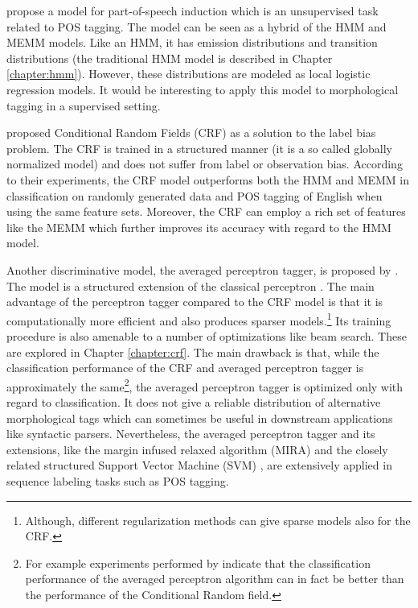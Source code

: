 \cite{Berg-Kirkpatrick2010} propose a model for part-of-speech
induction which is an unsupervised task related to POS tagging. The
model can be seen as a hybrid of the HMM and MEMM models. Like an HMM,
it has emission distributions and transition distributions (the
traditional HMM model is described in Chapter
\ref{chapter:hmm}). However, these distributions are modeled as local
logistic regression models. It would be interesting to apply this
model to morphological tagging in a supervised setting.

\cite{Lafferty2001} proposed Conditional Random Fields (CRF) as a
solution to the label bias problem. The CRF is trained in a structured
manner (it is a so called globally normalized model) and does not
suffer from label or observation bias. According to their experiments,
the CRF model outperforms both the HMM and MEMM in classification on
randomly generated data and POS tagging of English when using the same
feature sets. Moreover, the CRF can employ a rich set of features like
the MEMM which further improves its accuracy with regard to the HMM
model.

Another discriminative model, the averaged perceptron tagger, is
proposed by \cite{Collins2002}. The model is a
structured extension of the classical perceptron
\citep{Rosenblatt1958}. The main advantage of the perceptron tagger
compared to the CRF model is that it is computationally more efficient
and also produces sparser models.\footnote{Although, different
  regularization methods can give sparse models also for the CRF.} Its
training procedure is also amenable to a number of optimizations like
beam search. These are explored in Chapter \ref{chapter:crf}. The main
drawback is that, while the classification performance of the CRF and
averaged perceptron tagger is approximately the same\footnote{For
  example experiments performed by \cite{Nguyen2007} indicate that the
  classification performance of the averaged perceptron algorithm can
  in fact be better than the performance of the Conditional Random
  field.}, the averaged perceptron tagger is optimized only with
regard to classification. It does not give a reliable distribution of
alternative morphological tags which can sometimes be useful in
downstream applications like syntactic parsers. Nevertheless, the
averaged perceptron tagger and its extensions, like the margin infused
relaxed algorithm (MIRA) \cite{Taskar2003} and the closely related
structured Support Vector Machine (SVM) \citep{Tsochantaridis2005},
are extensively applied in sequence labeling tasks such as POS
tagging.

